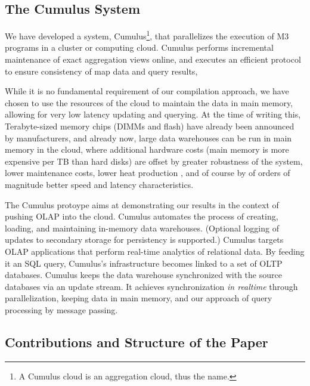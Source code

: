 \subsection{The Cumulus System}


We have developed a system, Cumulus\footnote{A Cumulus cloud is an
aggregation cloud, thus the name.}, that parallelizes the
execution of M3 programs in a cluster or computing cloud.
Cumulus performs incremental maintenance of exact aggregation views online, and
executes an efficient
protocol to ensure consistency of map data and query results,

While it is no fundamental requirement of our compilation
approach, we have chosen to use the resources of the cloud to maintain
the data in main memory, allowing for very low latency updating and querying.
At the time of writing this,
Terabyte-sized memory chips (DIMMs and flash) have already been announced by
manufacturers, and already now, large data warehouses
can be run in main memory in the cloud, where additional hardware costs
(main memory is more expensive per TB than hard disks) are
offset by greater robustness of the system, lower maintenance
costs, lower heat production \cite{1154557}, and of course by of orders
of magnitude better speed and latency characteristics.

The Cumulus protoype aims at demonstrating our results in the context of
pushing OLAP into the cloud.
Cumulus automates  the process of  creating, loading,
and  maintaining  in-memory  data  warehouses.
(Optional logging of updates to secondary storage
for persistency is supported.)
Cumulus targets OLAP applications  that perform real-time analytics of
relational data.  By feeding it an SQL query, Cumulus's infrastructure
becomes linked to  a set of OLTP databases.  Cumulus  keeps the
data warehouse synchronized with the source databases via an
update stream. It achieves synchronization {\em in realtime}
through parallelization, keeping data in main memory, and our approach of
query processing by message passing.


\subsection{Contributions and Structure of the Paper}


